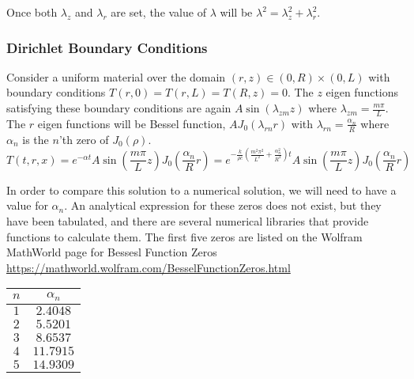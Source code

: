 \documentclass[letterpaper,12pt]{article}
\begin{document}
Once both $\lambda_z$ and $\lambda_r$ are set, the value of $\lambda$ will be $\lambda^2 = \lambda_z^2 + \lambda_r^2$.

\subsubsection{Dirichlet Boundary Conditions}
Consider a uniform material over the domain $(r,z) \in (0,R)\times(0,L)$ with boundary conditions $T(r,0) = T(r,L) = T(R,z) = 0$.
The $z$ eigen functions satisfying these boundary conditions are again 
$A \sin(\lambda_{zm} z)$ where $\lambda_{zm} = \frac{m\pi}{L}$.
The $r$ eigen functions will be Bessel function, $A J_0(\lambda_{rn} r)$ with $\lambda_{rn} = \frac{\alpha_n}{R}$ where
$\alpha_n$ is the $n$'th zero of $J_0(\rho)$.
\begin{equation}
T(t,r,x) = e^{-\alpha t} A \sin\left(\frac{m\pi}{L} z\right) J_0\left(\frac{\alpha_n}{R} r\right) = 
e^{-\frac{k}{\rho c}\left( \frac{m^2\pi^2}{L^2} + \frac{\alpha_n^2}{R^2}\right) t} A \sin\left(\frac{m\pi}{L} z\right) J_0\left(\frac{\alpha_n}{R} r\right)
\end{equation}

In order to compare this solution to a numerical solution, we will need to have a value for $\alpha_n$. An analytical expression
for these zeros does not exist, but they have been tabulated, and there are several numerical libraries that provide functions to calculate them.
The first five zeros are listed on the Wolfram MathWorld page for Bessesl Function Zeros \url{https://mathworld.wolfram.com/BesselFunctionZeros.html}

\begin{tabular}{cc}
  $n$ & $\alpha_n$ \\
  \hline
  $1$ & $2.4048$ \\
  $2$ & $5.5201$ \\
  $3$ & $8.6537$ \\
  $4$ & $11.7915$ \\
  $5$ & $14.9309$
\end{tabular}
\end{document}
